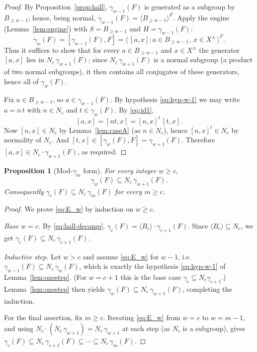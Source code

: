 \documentclass{amsart}
\newtheorem{proposition}{Proposition}
\theoremstyle{definition}
\theoremstyle{remark}
\begin{document}
\begin{proof}
By Proposition~\ref{prop:hall}, $\gamma_{w-1}(F)$ is generated as a subgroup by
$B_{\ge w-1}$; hence, being normal, $\gamma_{w-1}(F)=\langle B_{\ge w-1}\rangle^{F}$.
Apply the engine (Lemma~\ref{lem:engine}) with $S=B_{\ge w-1}$ and
$H=\gamma_{w-1}(F)$:
\[
\gamma_w(F)=[\gamma_{w-1}(F),F]
=\big\langle\,[a,x] : a\in B_{\ge w-1},\ x\in X^{\pm}\,\big\rangle^{F}.
\]
Thus it suffices to show that for every $a\in B_{\ge w-1}$ and $x\in X^{\pm}$ the
generator $[a,x]$ lies in $N_c\,\gamma_{w+1}(F)$; since $N_c\,\gamma_{w+1}(F)$ is a
normal subgroup (a product of two normal subgroups), it then contains all
conjugates of these generators, hence all of $\gamma_w(F)$.

Fix $a\in B_{\ge w-1}$, so $a\in\gamma_{w-1}(F)$. By hypothesis
\eqref{eq:hyp-w-1} we may write $a=n\,t$ with $n\in N_c$ and $t\in\gamma_w(F)$.
By \eqref{eq:id1},
\[
[a,x]=[nt,x]=[n,x]^{t}\,[t,x].
\]
Now $[n,x]\in N_c$ by Lemma~\ref{lem:caseA} (as $n\in N_c$), hence
$[n,x]^{t}\in N_c$ by normality of $N_c$. And $[t,x]\in[\gamma_w(F),F]
=\gamma_{w+1}(F)$. Therefore $[a,x]\in N_c\cdot\gamma_{w+1}(F)$, as required.
\end{proof}

\begin{proposition}[Mod-$\gamma_m$ form]\label{prop:moddescent}
For every integer $w\ge c$,
\begin{equation}\label{eq:E_w}
\gamma_w(F)\subseteq N_c\,\gamma_{w+1}(F).
\end{equation}
Consequently $\gamma_c(F)\subseteq N_c\,\gamma_m(F)$ for every $m\ge c$.
\end{proposition}

\begin{proof}
We prove \eqref{eq:E_w} by induction on $w\ge c$.

\emph{Base $w=c$.} By \eqref{eq:hall-decomp},
$\gamma_c(F)=\langle B_c\rangle\cdot\gamma_{c+1}(F)$. Since
$\langle B_c\rangle\subseteq N_c$, we get
$\gamma_c(F)\subseteq N_c\,\gamma_{c+1}(F)$.

\emph{Inductive step.} Let $w>c$ and assume \eqref{eq:E_w} for $w-1$, i.e.\
$\gamma_{w-1}(F)\subseteq N_c\,\gamma_{w}(F)$, which is exactly the hypothesis
\eqref{eq:hyp-w-1} of Lemma~\ref{lem:onestep}. (For $w=c+1$ this is the base case
$\gamma_c\subseteq N_c\gamma_{c+1}$.) Lemma~\ref{lem:onestep} then yields
$\gamma_w(F)\subseteq N_c\,\gamma_{w+1}(F)$, completing the induction.

For the final assertion, fix $m\ge c$. Iterating \eqref{eq:E_w} from $w=c$ to
$w=m-1$, and using $N_c\cdot(N_c\,\gamma_{w+1})=N_c\,\gamma_{w+1}$ at each step
(as $N_c$ is a subgroup), gives
$\gamma_c(F)\subseteq N_c\,\gamma_{c+1}(F)\subseteq\cdots\subseteq N_c\,\gamma_m(F)$.
\end{proof}
\end{document}
